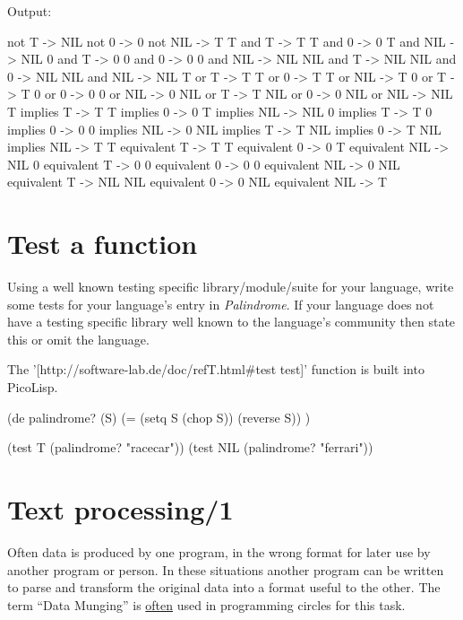 \begin{wideverbatim}

Output:

not T -> NIL
not 0 -> 0
not NIL -> T
T and T -> T
T and 0 -> 0
T and NIL -> NIL
0 and T -> 0
0 and 0 -> 0
0 and NIL -> NIL
NIL and T -> NIL
NIL and 0 -> NIL
NIL and NIL -> NIL
T or T -> T
T or 0 -> T
T or NIL -> T
0 or T -> T
0 or 0 -> 0
0 or NIL -> 0
NIL or T -> T
NIL or 0 -> 0
NIL or NIL -> NIL
T implies T -> T
T implies 0 -> 0
T implies NIL -> NIL
0 implies T -> T
0 implies 0 -> 0
0 implies NIL -> 0
NIL implies T -> T
NIL implies 0 -> T
NIL implies NIL -> T
T equivalent T -> T
T equivalent 0 -> 0
T equivalent NIL -> NIL
0 equivalent T -> 0
0 equivalent 0 -> 0
0 equivalent NIL -> 0
NIL equivalent T -> NIL
NIL equivalent 0 -> 0
NIL equivalent NIL -> T

\end{wideverbatim}

\pagebreak{}
\section*{Test a function}

Using a well known testing specific library/module/suite for your
language, write some tests for your language's entry in
\emph{Palindrome}. If your language does not have a
testing specific library well known to the language's community then
state this or omit the language.


\begin{wideverbatim}

The '[http://software-lab.de/doc/refT.html#test test]' function is
built into PicoLisp.

(de palindrome? (S)
   (= (setq S (chop S)) (reverse S)) )

(test T (palindrome? "racecar"))
(test NIL (palindrome? "ferrari"))

\end{wideverbatim}

\pagebreak{}
\section*{Text processing/1}

Often data is produced by one program, in the wrong format for later
use by another program or person. In these situations another program
can be written to parse and transform the original data into a format
useful to the other. The term ``Data Munging'' is
\href{http://www.google.co.uk/search?q=\%22data+munging\%22}{often}
used in programming circles for this task.

